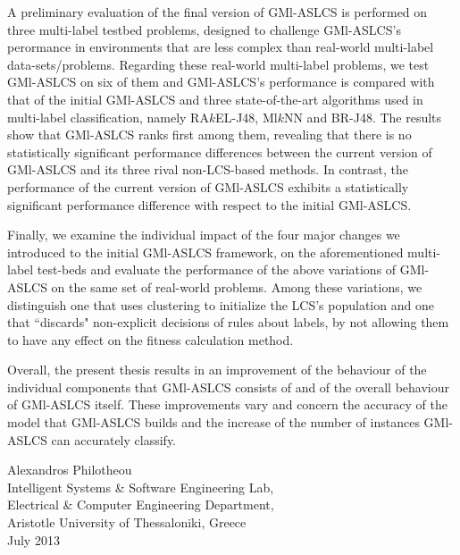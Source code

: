 {A preliminary evaluation of the final version of GMl-ASLCS is performed on three multi-label testbed problems, designed to challenge GMl-ASLCS's perormance in environments that are less complex than real-world multi-label data-sets/problems. Regarding these real-world multi-label problems, we test GMl-ASLCS on six of them and GMl-ASLCS's performance is compared with that of the initial GMl-ASLCS and three state-of-the-art algorithms used in multi-label classification, namely RA$k$EL-J48, Ml$k$NN and BR-J48. The results show that GMl-ASLCS ranks first among them, revealing that there is no statistically significant performance differences between the current version of GMl-ASLCS and its three rival non-LCS-based methods. In contrast, the performance of the current version of GMl-ASLCS exhibits a statistically significant performance difference with respect to the initial GMl-ASLCS.

Finally, we examine the individual impact of the four major changes we introduced to the initial GMl-ASLCS framework, on the aforementioned multi-label test-beds and evaluate the performance of the above variations of GMl-ASLCS on the same set of real-world problems. Among these variations, we distinguish one that uses clustering to initialize the LCS's population and one that “discards" non-explicit decisions of rules about labels, by not allowing them to have any effect on the fitness calculation method.

Overall, the present thesis results in an improvement of the behaviour of the individual components that GMl-ASLCS consists of and of the overall behaviour of GMl-ASLCS itself. These improvements vary and concern the accuracy of the model that GMl-ASLCS builds and the increase of the number of instances GMl-ASLCS can accurately classify.
\\

\begin{flushright}
\vspace{2cm}
Alexandros Philotheou
\\
Intelligent Systems \& Software Engineering Lab,
\\
Electrical \& Computer Engineering Department,
\\
Aristotle University of Thessaloniki, Greece
\\
July 2013
\end{flushright}

}